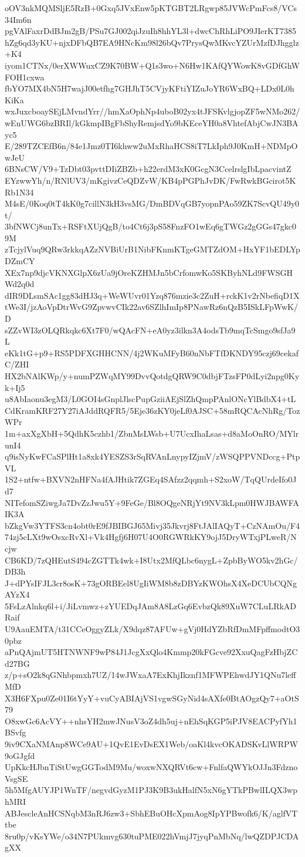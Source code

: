 oOV3nkMQMSljE5RzB+0Gxq5JVxEnw5pKTGBT2LRgwp85JVWcPmFcs8/VCs34Im6n
pgVAlFaxrDdBJm2gB/PSu7GJ002qiJzuIh8hhYL3l+dwcChRhLiPO9JIerKT7385
hZg6qd3yKU+njxDFbQB7EA9HNcKm98l26bQv7PrysQwMKvcYZUrMzfDJhgglz+K4
iyom1CTNx/0erXWWuxCZ9K70BW+Q1s3wo+N6Hw1KAfQYWowK8vGDfGhWFOH1cxwa
fbYO7MX4bN5H7wajJ00etfhg7GHJhT5CVjyKFtiYIZuJoYR6WxBQ+LDx0L0hKiKa
wxJuxcboaySEjLMvndYrr//hmXaOphNp4uboB02yx4tJFSKvlgjopZF5wNMo262/
wEnUWG6bzBRIl/kGkmpIBgFbShyRemjsdYo9bKEceYH0a8VhtefAbjCwJN3BAyc5
E/289TZCEfB6n/84e1Jmz0TI6khww2uMxRhaHCS8iT7LkIph9J0KmH+NDMpOwJeU
6BNsCW/V9+TzDbt03pvttDIiZBZb+h22erdM3xK0GcgN3CcelrslgIbLpacvintZ
EYzwwYh/n/RNlUV3/mKgivzCeQDZvW/KB4pPGPhJvDK/FwRwkBGcirot5KRb1N34
M4sE/0Koq0tT4kK0g7cillN3kH3vsMG/DmBDVqGB7yopnPAo59ZK7ScvQU49y0t/
3bfNWCj8unTx+RSFtXUjQgB/to4Ct6j3pS58FnzFO1wEq6gTWGz2gGGs47gkc09M
zTcjylVuq9QRw3rkkqAZzNVBiUrB1NibFKnmKTgeGMTZdOM+HxYF1bEDLYpDZmCY
XEx7np9djcVKNXGlpX6zUa9jOreKZHMJn5bCrfomwKo5SKByhNLd9FWSGHWd2q0d
dIR9DLsmSAc1gg83dHJ3q+WeWUvr01Yzq876mzie3c2ZuH+rckK1v2rNbefiqD1X
tWe3I/jzAoVpDtrWvG9ZpvwvCIk22av6SZlhImIp8PNawRz6nQzB5ISkLFpWwK/D
sZZvWI3zOLQRkqkc6Xt7F0/wQAcFN+eA0yz3ilkn3A4odsTb9mqTcSmgo9sfJa9L
eKk1tG+p9+RS5PDFXGHHCNN/4j2WKuMFyB60nNbFTfDKNDY95czj69cekafC/ZHI
HX2bNAlKWp/y+numPZWqMY99DvvQotdgQRW9C0dbjFTzsFP0dLyi2npg0Kyk+Ij5
u8AbIaonu3egM3/L0GOI4sGnplJlscPupGziiAEjSlZhQmpPAnlONcYlBdbX4+tL
CdKramKRF27Y27iAJddRQFR5/5Eje36zKY0jeLf0AJSC+58mRQCAcNhRg/TozWPr
1m+axXgXbH+5QdhK5czhb1/ZbnMsLWsb+U7UcxIhaLsas+d8aMoOnRO/MYlrunI4
q9isNyKwFCaSPlHt1a8xk4YESZS3rSqRVAnLnypyIZjmV/zWSQPPVNDccg+PtpVL
1S2+ntfw+BXVN2nHFNa4fAJHtik7ZGEq4SAfzz2qqmh+S2xoW/TqQUrdeIfo0Jd7
NITefomSZiwgJa7DvZzJwu5Y+9FeGe/Bl8OQgeNRjYt9NV3kLpm0HWJBAWFAIK3A
bZkgVw3YTFS3cn4obt0rE9fJBIBGJ65Mivj35Jkvrj8FtJAlIAQyT+CzNAmOu/F4
74zj5cLXt9wOsxcRvXl+Vk4Hgfj6H07U4O0RGWRkKY9ojJ5DryWTxjPLweR/Ncjw
CB6KD/7zQHEutS494cZGTTk4wk+I8Utx2MfQLbc6nygL+ZpbByWO5kv2hGc/DB3h
J+dPYsIFJL3cr8osK+73gORBEel8UgIiWM8b8zDBYzKWOhsX4XeDCUbCQNgAYzX4
5FsLzAlnkq6l+i/JiLvmwz+zYUEDqJAm8A8LzGq6EvbzQk89XuW7CLuLRkADRaif
U9AauEMTA/t31CCeOggyZLk/X9dqz87AFUw+gVj0HdYZbRfDmMFpffmodtO30pbz
aPnQAjmUT5HTNWNF9wP84J1JcgXxQlo4Kmmp20kFGcve92XxuQagFzHbjZCd27BG
z/p+sO2k8qGNhbpmxh7UZ/14wJWxaA7ExKhjIkznf1MFWPEhwdJY1QNu7leffMfD
X3H6FXpu0Ze01I6tYyY+vuCyABIAjVS1vgwSGyNid4sAXfe0BtAOgzQy7+aOtS79
O8xwGc6AcVY++nhsYH2mwJNusV3oZ4dh5uj+nEhSqKGP5iPJV8EACPyfYh1BSvfg
9iv9CXaNMAnp8WCe9AU+1QvE1EvDsEX1Web/oaKl4kvcOKADSKvLlWRPW9oGJgfd
UpKkcHJbnTiStUwgGGTodM9Mu/woxwNXQRVt6cw+FnlfaQWYkOJJn3FdznoVsgSE
5h5MfgAUYJP1WnTF/negvdGyzM1PJ3K9B3ukHalfN5xN6gYTkPBwlILQX3wphMRI
ABJescleAnHCSNqbM3nRJ6zw3+SbhEBuOHcXpmAog8IpYPBwofk6/K/aglfVTtbe
8ru0p/vKsYWe/o34N7PUkmvg630tuPME022hVmjJ7jyqPnMbNq/lwQZDPJCDAgXX
